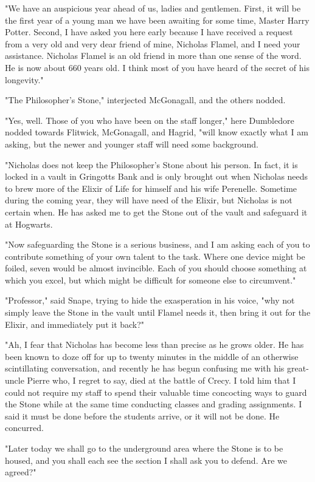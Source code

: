 \documentclass[a4paper,11pt]{article}
\begin{document}
"We have an auspicious year ahead of us, ladies and gentlemen. First, it will be the first year of a young man we have been awaiting for some time, Master Harry Potter. Second, I have asked you here early because I have received a request from a very old and very dear friend of mine, Nicholas Flamel, and I need your assistance. Nicholas Flamel is an old friend in more than one sense of the word. He is now about 660 years old. I think most of you have heard of the secret of his longevity."

"The Philosopher's Stone," interjected McGonagall, and the others nodded.

"Yes, well. Those of you who have been on the staff longer," here Dumbledore nodded towards Flitwick, McGonagall, and Hagrid, "will know exactly what I am asking, but the newer and younger staff will need some background.

"Nicholas does not keep the Philosopher's Stone about his person. In fact, it is locked in a vault in Gringotts Bank and is only brought out when Nicholas needs to brew more of the Elixir of Life for himself and his wife Perenelle. Sometime during the coming year, they will have need of the Elixir, but Nicholas is not certain when. He has asked me to get the Stone out of the vault and safeguard it at Hogwarts.

"Now safeguarding the Stone is a serious business, and I am asking each of you to contribute something of your own talent to the task. Where one device might be foiled, seven would be almost invincible. Each of you should choose something at which you excel, but which might be difficult for someone else to circumvent."

"Professor," said Snape, trying to hide the exasperation in his voice, "why not simply leave the Stone in the vault until Flamel needs it, then bring it out for the Elixir, and immediately put it back?"

"Ah, I fear that Nicholas has become less than precise as he grows older. He has been known to doze off for up to twenty minutes in the middle of an otherwise scintillating conversation, and recently he has begun confusing me with his great-uncle Pierre who, I regret to say, died at the battle of Crecy. I told him that I could not require my staff to spend their valuable time concocting ways to guard the Stone while at the same time conducting classes and grading assignments. I said it must be done before the students arrive, or it will not be done. He concurred.

"Later today we shall go to the underground area where the Stone is to be housed, and you shall each see the section I shall ask you to defend. Are we agreed?"
\end{document}
